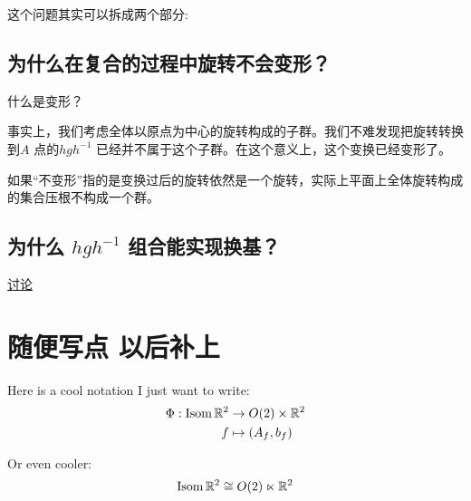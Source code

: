 \documentclass{ctexrep}
\DeclareMathOperator{\Isom}{\mathrm{Isom}}
\begin{document}
这个问题其实可以拆成两个部分:
\subsection{为什么在复合的过程中旋转不会变形？}
什么是变形？

事实上，我们考虑全体以原点为中心的旋转构成的子群。我们不难发现把旋转转换到\(A\) 点的\(hgh^{-1}\)
已经并不属于这个子群。在这个意义上，这个变换已经变形了。

如果``不变形''指的是变换过后的旋转依然是一个旋转，实际上平面上全体旋转构成的集合压根不构成一个群。

\subsection{为什么 \(hgh^{-1}\) 组合能实现换基？}

\href{https://math.stackexchange.com/questions/11971/intuition-behind-conjugation-in-group-theory}{讨论}

\section{随便写点 以后补上}
Here is a cool notation I just want to write:
\begin{align*}
    \Phi:\Isom \R^{2} &\to O(2) \times \R^{2} \\
    f &\mapsto (A_{f}, b_{f}) \\
\end{align*}

Or even cooler:
\[
    \Isom \R^{2} \cong O(2) \ltimes \R^{2}
\]


\end{document}
